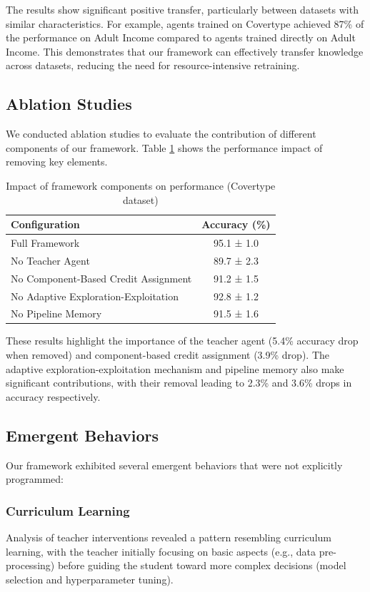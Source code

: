 \documentclass[twoside,11pt]{article}
\begin{document}
The results show significant positive transfer, particularly between datasets with similar characteristics. For example, agents trained on Covertype achieved 87\% of the performance on Adult Income compared to agents trained directly on Adult Income. This demonstrates that our framework can effectively transfer knowledge across datasets, reducing the need for resource-intensive retraining.

\subsection{Ablation Studies}

We conducted ablation studies to evaluate the contribution of different components of our framework. Table \ref{tab:ablation} shows the performance impact of removing key elements.

\begin{table}[ht]
\centering
\caption{Impact of framework components on performance (Covertype dataset)}
\label{tab:ablation}
\begin{tabular}{lc}
\toprule
Configuration & Accuracy (\%) \\
\midrule
Full Framework & 95.1 ± 1.0 \\
No Teacher Agent & 89.7 ± 2.3 \\
No Component-Based Credit Assignment & 91.2 ± 1.5 \\
No Adaptive Exploration-Exploitation & 92.8 ± 1.2 \\
No Pipeline Memory & 91.5 ± 1.6 \\
\bottomrule
\end{tabular}
\end{table}

These results highlight the importance of the teacher agent (5.4\% accuracy drop when removed) and component-based credit assignment (3.9\% drop). The adaptive exploration-exploitation mechanism and pipeline memory also make significant contributions, with their removal leading to 2.3\% and 3.6\% drops in accuracy respectively.

\subsection{Emergent Behaviors}

Our framework exhibited several emergent behaviors that were not explicitly programmed:

\subsubsection{Curriculum Learning}
Analysis of teacher interventions revealed a pattern resembling curriculum learning, with the teacher initially focusing on basic aspects (e.g., data 
pre-processing) before guiding the student toward more complex decisions (model selection and hyperparameter tuning).
\end{document}
